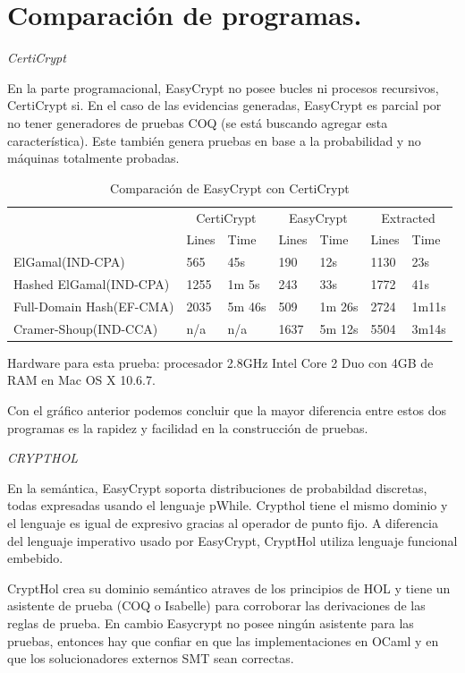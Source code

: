 \documentclass[runningheads,a4paper]{llncs}
\begin{document}
\section{Comparación de programas.}
\centerline{\emph{CertiCrypt}}
En la parte programacional, EasyCrypt no posee bucles ni procesos recursivos, CertiCrypt si. En el caso de las evidencias generadas, EasyCrypt es parcial por no tener generadores de pruebas COQ (se está buscando agregar esta característica). Este también genera pruebas en base a la probabilidad y no máquinas totalmente probadas.

\begin{table}
  \caption{Comparación de EasyCrypt con CertiCrypt}
  \label{tab:simple1}
  \centering
  \begin{tabular}{ |p{3.5cm}|p{1.5cm}|p{1.5cm}|p{1.5cm}|p{1.5cm}|p{1.5cm}|p{1.5cm}|  }
 \hline
 & \multicolumn{2}{|c|}{CertiCrypt} & \multicolumn{2}{|c|}{EasyCrypt} & \multicolumn{2}{|c|}{Extracted} \\\cline{2-7}

 &Lines&Time&Lines&Time&Lines&Time\\\cline{2-7}
 \hline
 ElGamal(IND-CPA) & 565 & 45s & 190 & 12s & 1130 & 23s\\
 Hashed ElGamal(IND-CPA) & 1255  & 1m 5s & 243  & 33s & 1772 & 41s\\
 Full-Domain Hash(EF-CMA) & 2035 & 5m 46s&  509 & 1m 26s & 2724 & 1m11s\\
 Cramer-Shoup(IND-CCA) & n/a & n/a & 1637 & 5m 12s & 5504 & 3m14s\\
 \hline
\end{tabular}
\end{table}

Hardware para esta prueba: procesador 2.8GHz Intel Core 2 Duo con 4GB de RAM en Mac OS X 10.6.7.\cite{article3}

Con el gráfico anterior podemos concluir que la mayor diferencia entre estos dos programas es la rapidez y facilidad en la construcción de pruebas.

\centerline{\emph{CRYPTHOL}}

En la semántica, EasyCrypt soporta distribuciones de probabildad discretas, todas expresadas usando el lenguaje pWhile. Crypthol tiene el mismo dominio y el lenguaje es igual de expresivo gracias al operador de punto fijo. A diferencia del lenguaje imperativo usado por EasyCrypt, CryptHol utiliza lenguaje funcional embebido.

CryptHol crea su dominio semántico atraves de los principios de HOL y tiene un asistente de prueba (COQ o Isabelle) para corroborar las derivaciones de las reglas de prueba. En cambio Easycrypt no posee ningún asistente para las pruebas, entonces hay que confiar en que las implementaciones en OCaml y en que los solucionadores externos SMT sean correctas.
\end{document}
